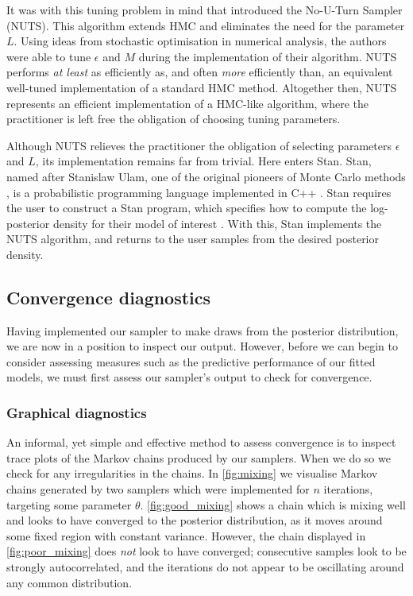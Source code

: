It was with this tuning problem in mind that \textcite{hoffman14} introduced
the No-U-Turn Sampler (NUTS). This algorithm extends HMC and eliminates the
need for the parameter $L$. Using ideas from stochastic optimisation in
numerical analysis, the authors were able to tune $\epsilon$ and $M$ during the
implementation of their algorithm. NUTS performs \emph{at least} as efficiently
as, and often \emph{more} efficiently than, an equivalent well-tuned
implementation of a standard HMC method. Altogether then, NUTS represents an
efficient implementation of a HMC-like algorithm, where the practitioner is
left free the obligation of choosing tuning parameters. 

Although NUTS relieves the practitioner the obligation of selecting parameters
$\epsilon$ and $L$, its implementation remains far from trivial. Here enters
Stan. Stan, named after Stanislaw Ulam, one of the original pioneers of Monte
Carlo methods \parencite{metropolis49}, is a probabilistic programming language
implemented in C++ \parencite{gelman15}. Stan requires the user to construct a
Stan program, which specifies how to compute the log-posterior density for
their model of interest \parencite{stanteam15}. With this, Stan implements the
NUTS algorithm, and returns to the user samples from the desired posterior
density.

\subsection{Convergence diagnostics}
\label{ssec:convergence_diagnostics}

Having implemented our sampler to make draws from the posterior distribution,
we are now in a position to inspect our output. However, before we can begin to
consider assessing measures such as the predictive performance of our fitted
models, we must first assess our sampler's output to check for convergence.

\subsubsection{Graphical diagnostics}

An informal, yet simple and effective method to assess convergence is to
inspect trace plots of the Markov chains produced by our samplers. When we do
so we check for any irregularities in the chains. In \cref{fig:mixing} we
visualise Markov chains generated by two samplers which were implemented for
$n$ iterations, targeting some parameter $\theta$. \cref{fig:good_mixing} shows
a chain which is mixing well and looks to have converged to the posterior
distribution, as it moves around some fixed region with constant variance.
However, the chain displayed in \cref{fig:poor_mixing} does \emph{not} look to
have converged; consecutive samples look to be strongly autocorrelated, and the
iterations do not appear to be oscillating around any common distribution.

